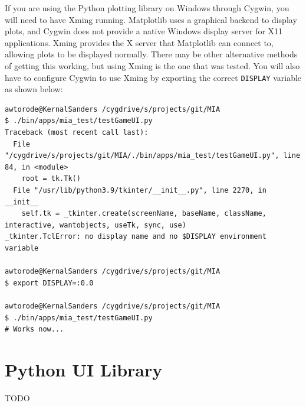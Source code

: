 If you are using the Python plotting library on Windows through Cygwin, you will need to have Xming running. Matplotlib uses a graphical backend to display plots, and Cygwin does not provide a native Windows display server for X11 applications. Xming provides the X server that Matplotlib can connect to, allowing plots to be displayed normally. There may be other alternative methods of getting this working, but using Xming is the one that was tested. You will also have to configure Cygwin to use Xming by exporting the correct \texttt{DISPLAY} variable as shown below:
\begin{lstlisting}[style=terminalstyle]
awtorode@KernalSanders /cygdrive/s/projects/git/MIA
$ ./bin/apps/mia_test/testGameUI.py
Traceback (most recent call last):
  File "/cygdrive/s/projects/git/MIA/./bin/apps/mia_test/testGameUI.py", line 84, in <module>
    root = tk.Tk()
  File "/usr/lib/python3.9/tkinter/__init__.py", line 2270, in __init__
    self.tk = _tkinter.create(screenName, baseName, className, interactive, wantobjects, useTk, sync, use)
_tkinter.TclError: no display name and no $DISPLAY environment variable

awtorode@KernalSanders /cygdrive/s/projects/git/MIA
$ export DISPLAY=:0.0

awtorode@KernalSanders /cygdrive/s/projects/git/MIA
$ ./bin/apps/mia_test/testGameUI.py
# Works now...
\end{lstlisting}














\section{Python UI Library}\label{section:python_ui_lib}

TODO